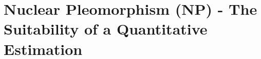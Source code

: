 \documentclass[usenames,dvipsnames]{beamer}
\begin{document}
    
\begin{frame}
\titlepage
\end{frame}




\section{ Nuclear Pleomorphism (NP) - The Suitability of a Quantitative Estimation}

\end{document}
